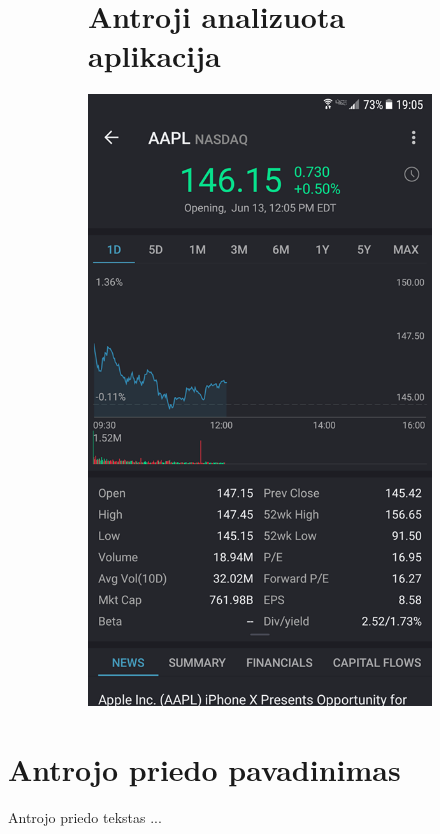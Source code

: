 \documentclass[a4paper,12pt,fleqn]{article}
\begin{document}
\begin{appendices}
\begin{figure}[h!]
\begin{subfigure}{0.5\textwidth}
		\section{Antroji analizuota aplikacija}
		\includegraphics[scale=0.4]{priedas4.png}
		\label{app:priedas4}
	\end{subfigure}
\end{figure}

\newpage
\section{Antrojo priedo pavadinimas}
Antrojo priedo tekstas ...

\end{appendices}
\end{document}
